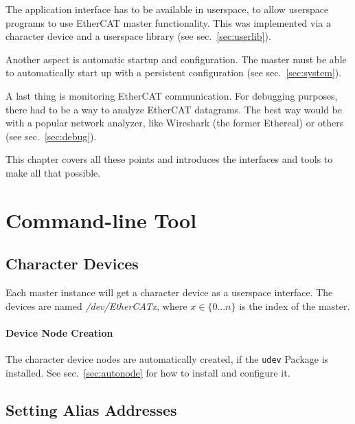 \documentclass[a4paper,12pt,BCOR6mm,bibtotoc,idxtotoc]{scrbook}
\begin{document}
The application interface has to be available in userspace, to allow userspace
programs to use EtherCAT master functionality. This was implemented via a
character device and a userspace library (see sec.~\ref{sec:userlib}).

Another aspect is automatic startup and configuration. The master must be able
to automatically start up with a persistent configuration (see
sec.~\ref{sec:system}).

A last thing is monitoring EtherCAT communication. For debugging purposes,
there had to be a way to analyze EtherCAT datagrams. The best way would be
with a popular network analyzer, like Wireshark \cite{wireshark} (the former
Ethereal) or others (see sec.~\ref{sec:debug}).

This chapter covers all these points and introduces the interfaces and tools
to make all that possible.


\section{Command-line Tool}
\label{sec:tool}


\subsection{Character Devices}
\label{sec:cdev}

Each master instance will get a character device as a userspace interface.
The devices are named \textit{/dev/EtherCATx}, where $x \in \{0 \ldots n\}$ is
the index of the master.

\paragraph{Device Node Creation} The character device nodes are automatically
created, if the \lstinline+udev+ Package is installed. See
sec.~\ref{sec:autonode} for how to install and configure it.


\subsection{Setting Alias Addresses}
\label{sec:ethercat-alias}
\end{document}
